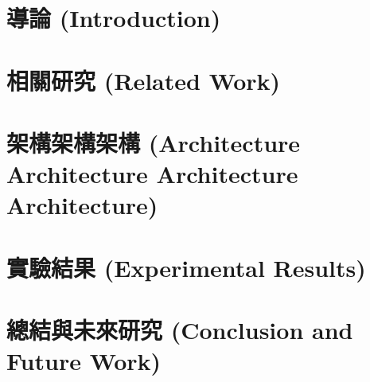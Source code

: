 \chapter{導論 (Introduction)}\label{chapter:introduction}
	
\chapter{相關研究 (Related Work)}\label{chapter:related work}
	
\chapter{架構架構架構 (Architecture Architecture Architecture Architecture)}\label{chapter:methods}
				
\chapter{實驗結果 (Experimental Results)}\label{chapter:experimental results}
	
\chapter{總結與未來研究 (Conclusion and Future Work)}\label{chapter:conclusion 
and future work}
	
	
	
	
	
	